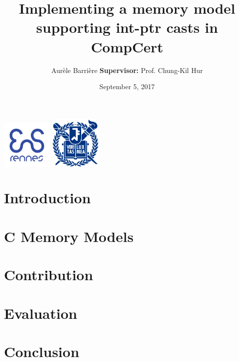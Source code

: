 \documentclass[page number]{beamer}
\begin{document}
\title[Int-Ptr casts in CompCert]{Implementing a memory model supporting int-ptr casts in CompCert}


\author[Aur\`ele Barri\`ere]{Aur\`ele Barri\`ere\hspace{3.6cm} \textbf{Supervisor:} Prof. Chung-Kil Hur}
\date{September 5, 2017}

\def\todo#1{{\color{red}TODO:\quad#1}}
\def\addref#1{{\color{red}$[$#1$]$}}
\def\undef{\textit{undef}}
\def\states#1{\mathit{States_{#1}}}
\def\step#1{\mathit{Step_{#1}}}
\def\atstep#1{\mathit{AtomicStep_{#1}}}
\def\traces{\mathit{Traces}}
\def\comment#1{{\color{blue}\textit{#1}}}
\def\outline{
  \begin{frame}[plain,noframenumbering]
    \frametitle{Outline}
    \tableofcontents[currentsection]
  \end{frame}
}



\begin{frame}
  \vspace{-2cm}
  \maketitle
  \vspace{-4cm}
  \begin{center}
    \includegraphics[width=2.5cm]{img/enslogo.png}
    \hfill
    \includegraphics[width=2.5cm]{img/snulogo.png}
  \end{center}
\end{frame}

\section{Introduction}


\section{C Memory Models}



\section{Contribution}


\section{Evaluation}


\section{Conclusion}

\end{document}
